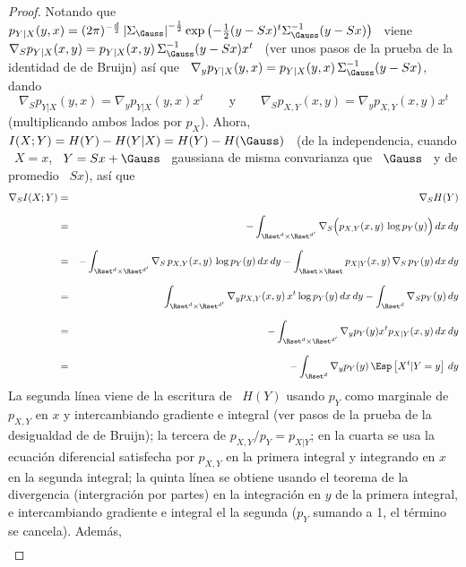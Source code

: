 %
\begin{proof}
  Notando  que \ $p_{Y|X}  (y,x) =  (2 \pi)^{-\frac{d}{2}}  \left| \Sigma_\Gauss
  \right|^{-\frac12}  \exp\left( -\frac12  (y-S  x)^t \Sigma_\Gauss^{-1}  (y-Sx)
  \right)$ \ viene \ $\nabla_S p_{Y|X}(x,y) = p_{Y|X}(x,y) \, \Sigma_\Gauss^{-1}
  (y - S  x) x^t$ \ (ver unos pasos  de la prueba de la  identidad de de Bruijn)
  as\'i que \ $\nabla_y p_{Y|X}(y,x) = p_{Y|X}(y,x) \, \Sigma_\Gauss^{-1} (y - S
  x)$, dando
  \[
  \nabla_S  p_{Y|X}(y,x)  = \nabla_y  p_{Y|X}(y,x)  x^t  \qquad \mbox{y}  \qquad
  \nabla_S p_{X,Y}(x,y) = \nabla_y p_{X,Y}(x,y) x^t
  \]
  (multiplicando ambos lados por $p_X$). Ahora, \ $I(X;Y) = H(Y) - H(Y|X) = H(Y)
  - H(\Gauss)$ \ (de la independencia, cuando \ $X  = x$, \ $Y = S x + \Gauss$ \
  gaussiana de misma convarianza que \ $\Gauss$  \ y de promedio \ $S x$), as\'i
  que
  \begin{eqnarray*}
  \nabla_S I(X;Y) & = & \nabla_S H(Y)\\[2.5mm]
  & = & - \int_{\Rset^d \times \Rset^{d'}} \nabla_S \Big( p_{X,Y}(x,y) \, \log
  p_Y(y) \Big) \, dx \, dy\\[2.5mm]
  & = & - \int_{\Rset^d \times \Rset^{d'}} \nabla_S \, p_{X,Y}(x,y) \, \log p_Y(y) \,
  dx \, dy - \int_{\Rset \times \Rset} p_{X|Y}(x,y) \, \nabla_S \, p_Y(y) \, dx \,
  dy\\[2.5mm]
  & = & \int_{\Rset^d \times \Rset^{d'}} \nabla_y p_{X,Y}(x,y) \, x^t \log p_Y(y)
  \, dx \, dy - \int_{\Rset^d} \nabla_S p_Y(y) \, dy\\[2.5mm]
  & = & - \int_{\Rset^d \times \Rset^{d'}} \nabla_y p_Y(y) x^t p_{X|Y}(x,y) \, dx
  \, dy\\[2.5mm]
  & = & - \int_{\Rset^d} \nabla_y p_Y(y) \, \Esp\left[X^t | Y = y \right] \, dy
  \end{eqnarray*}
  La segunda l\'inea  viene de la escritura de \ $H(Y)$  usando $p_Y$ como marginale
  de $p_{X,Y}$  en $x$ y  intercambiando gradiente e  integral (ver pasos  de la
  prueba de la desigualdad de de Bruijn); la tercera de $p_{X,Y}/p_Y = p_{X|Y}$;
  en la cuarta  se usa la ecuaci\'on diferencial satisfecha  por $p_{X,Y}$ en la
  primera integral y  integrando en $x$ en la segunda  integral; la quinta l\'inea
  se obtiene usando el teorema  de la divergencia (intergraci\'on por partes) en
  la integraci\'on en  $y$ de la primera integral,  e intercambiando gradiente e
  integral el la segunda ($p_Y$ sumando a 1, el t\'ermino se cancela). Adem\'as,
  \begin{eqnarray*}

\end{eqnarray*}
\end{proof}
